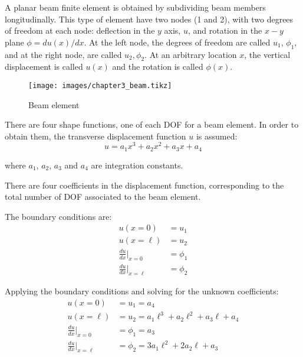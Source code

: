 A planar beam finite element is obtained by subdividing beam members longitudinally. This type of element have two nodes (1 and 2), with two degrees of freedom at each node: deflection in the $y$ axis, $u$, and rotation in the $x-y$ plane $\phi = du(x)/dx$.  At the left node, the degrees of freedom are called $u_1$, $\phi_1$, and at the right node, are called $u_2, \phi_2$. At an arbitrary location $x$, the vertical displacement is called $u(x)$ and the rotation is called $\phi(x)$.

\begin{figure}[H]
    \caption{Beam element}
    \label{fig:beamelement}
    \centering
    \vspace{1em}
    \texttt{[image: images/chapter3\_beam.tikz]}
\end{figure}



There are four shape functions, one of each DOF for a beam element. In order to obtain them, the transverse displacement function $u$ is assumed:
%
\begin{equation}
    u = a_1x^3 + a_2x^2 + a_3x + a_4
\end{equation}

where $a_1$, $a_2$, $a_3$ and $a_4$ are integration constants.

There are four coefficients in the displacement function, corresponding to the total number of DOF associated to the beam element.


The boundary conditions are:
%
\begin{align}
u(x = 0) &= u_1\\
u(x = \ell) &= u_2\\
\frac{du}{dx}\Big|_{x=0} &= \phi_1\\
\frac{du}{dx}\Big|_{x=\ell} &= \phi_2
\end{align}

Applying the boundary conditions and solving for the unknown coefficients:
%
\begin{align}
u(x = 0) &= u_1 = a_4\\
u(x = \ell) &= u_2 = a_1\ell^3 + a_2\ell^2 + a_3\ell + a_4\\
\frac{du}{dx}\Big|_{x=0} &= \phi_1 = a_3\\
\frac{du}{dx}\Big|_{x=\ell} &= \phi_2 = 3a_1\ell^2 + 2a_2\ell + a_3
\end{align}

